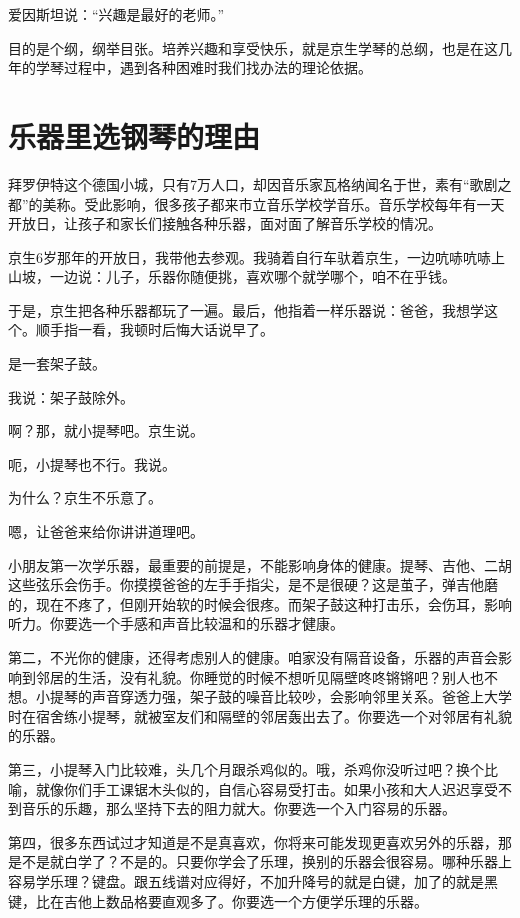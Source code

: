 \documentclass[twoside,openright,headings=optiontohead]{ctexbook} %
\begin{document}
{爱因斯坦说：``兴趣是最好的老师。''

目的是个纲，纲举目张。培养兴趣和享受快乐，就是京生学琴的总纲，也是在这几年的学琴过程中，遇到各种困难时我们找办法的理论依据。

\chapter*{乐器里选钢琴的理由}\label{why-piano}

拜罗伊特这个德国小城，只有7万人口，却因音乐家瓦格纳闻名于世，素有``歌剧之都''的美称。受此影响，很多孩子都来市立音乐学校学音乐。音乐学校每年有一天开放日，让孩子和家长们接触各种乐器，面对面了解音乐学校的情况。

京生6岁那年的开放日，我带他去参观。我骑着自行车驮着京生，一边吭哧吭哧上山坡，一边说：儿子，乐器你随便挑，喜欢哪个就学哪个，咱不在乎钱。

于是，京生把各种乐器都玩了一遍。最后，他指着一样乐器说：爸爸，我想学这个。顺手指一看，我顿时后悔大话说早了。

是一套架子鼓。

我说：架子鼓除外。

啊？那，就小提琴吧。京生说。

呃，小提琴也不行。我说。

为什么？京生不乐意了。

嗯，让爸爸来给你讲讲道理吧。

小朋友第一次学乐器，最重要的前提是，不能影响身体的健康。提琴、吉他、二胡这些弦乐会伤手。你摸摸爸爸的左手手指尖，是不是很硬？这是茧子，弹吉他磨的，现在不疼了，但刚开始软的时候会很疼。而架子鼓这种打击乐，会伤耳，影响听力。你要选一个手感和声音比较温和的乐器才健康。

第二，不光你的健康，还得考虑别人的健康。咱家没有隔音设备，乐器的声音会影响到邻居的生活，没有礼貌。你睡觉的时候不想听见隔壁咚咚锵锵吧？别人也不想。小提琴的声音穿透力强，架子鼓的噪音比较吵，会影响邻里关系。爸爸上大学时在宿舍练小提琴，就被室友们和隔壁的邻居轰出去了。你要选一个对邻居有礼貌的乐器。

第三，小提琴入门比较难，头几个月跟杀鸡似的。哦，杀鸡你没听过吧？换个比喻，就像你们手工课锯木头似的，自信心容易受打击。如果小孩和大人迟迟享受不到音乐的乐趣，那么坚持下去的阻力就大。你要选一个入门容易的乐器。

第四，很多东西试过才知道是不是真喜欢，你将来可能发现更喜欢另外的乐器，那是不是就白学了？不是的。只要你学会了乐理，换别的乐器会很容易。哪种乐器上容易学乐理？键盘。跟五线谱对应得好，不加升降号的就是白键，加了的就是黑键，比在吉他上数品格要直观多了。你要选一个方便学乐理的乐器。

}
\end{document}
